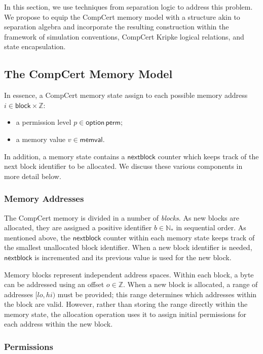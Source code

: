 \documentclass[acmsmall,screen,review,anonymous]{acmart}
\newcommand{\kw}[1]{\ensuremath{ \mathsf{#1} }}
\begin{document}
In this section,
we use techniques from separation logic
to address this problem.
We propose to equip the CompCert memory model
with a structure akin to separation algebra \cite{something-for-sa}
and incorporate the resulting construction
within the framework of simulation conventions,
CompCert Kripke logical relations,
and state encapsulation.

\subsection{The CompCert Memory Model}

In essence,
a CompCert memory state
assign to each possible memory address $i \in \kw{block} \times \mathbb{Z}$:
\begin{itemize}
  \item a permission level $p \in \kw{option}\,\kw{perm}$;
  \item a memory value $v \in \kw{memval}$.
\end{itemize}
In addition,
a memory state contains a $\kw{nextblock}$ counter
which keeps track of the next block identifier to be allocated.
We discuss these various components in more detail below.

\subsubsection{Memory Addresses}

The CompCert memory is divided in a number of \emph{blocks}.
As new blocks are allocated,
they are assigned a positive identifier $b \in \mathbb{N}_*$
in sequential order.
As mentioned above,
the $\kw{nextblock}$ counter within each memory state
keeps track of the smallest unallocated block identifier.
When a new block identifier is needed,
$\kw{nextblock}$ is incremented and its previous value
is used for the new block.

Memory blocks represent independent address spaces.
Within each block,
a byte can be addressed using an offset $o \in \mathbb{Z}$.
When a new block is allocated,
a range of addresses $[\mathit{lo}, \mathit{hi})$ must be provided;
this range determines which addresses within the block are valid.
However,
rather than storing the range directly within the memory state,
the allocation operation uses it to assign initial permissions
for each address within the new block.

\subsubsection{Permissions}
\end{document}
